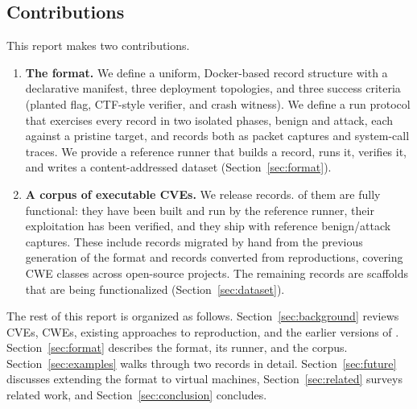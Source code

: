 \subsection{Contributions}

This report makes two contributions.

\begin{enumerate}
\item \textbf{The \cvexthree format.} We define a uniform, Docker-based record
structure with a declarative manifest, three deployment topologies, and three
success criteria (planted flag, CTF-style verifier, and crash witness). We
define a run protocol that exercises every record in two isolated phases,
benign and attack, each against a pristine target, and records both as packet
captures and system-call traces. We provide a reference runner that builds a
record, runs it, verifies it, and writes a content-addressed dataset
(Section~\ref{sec:format}).

\item \textbf{A corpus of executable CVEs.} We release \NumRecords \cvexthree
records. \NumFunctional of them are fully functional: they have been built
and run by the reference runner, their exploitation has been verified, and
they ship with reference benign/attack captures. These include \NumMigratedFunctional
records migrated by hand from the previous generation of the format
and \NumGenieFunctional records converted from \genie reproductions, covering
\NumGenieCWEs CWE classes across \NumGenieProjects open-source projects. The
remaining records are scaffolds that are being functionalized
(Section~\ref{sec:dataset}).
\end{enumerate}

The rest of this report is organized as follows. Section~\ref{sec:background}
reviews CVEs, CWEs, existing approaches to reproduction, and the earlier
versions of \cvex. Section~\ref{sec:format} describes the \cvexthree format,
its runner, and the corpus. Section~\ref{sec:examples} walks through two
records in detail. Section~\ref{sec:future} discusses extending the format to
virtual machines, Section~\ref{sec:related} surveys related work, and
Section~\ref{sec:conclusion} concludes.
